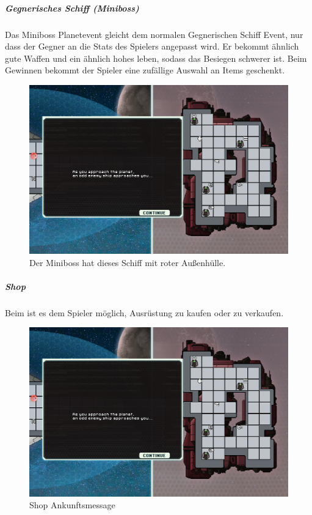 \documentclass[fontsize=12pt,paper=a4,twoside]{scrartcl}
\begin{document}
\subparagraph{Gegnerisches Schiff (Miniboss)} Das Miniboss Planetevent gleicht dem normalen Gegnerischen Schiff Event, nur dass der Gegner an die Stats des Spielers angepasst wird. Er bekommt ähnlich gute Waffen und ein ähnlich hohes leben, sodass das Besiegen schwerer ist. Beim Gewinnen bekommt der Spieler eine zufällige Auswahl an Items geschenkt. 

\begin{figure}[H]
\centering
\includegraphics[width=1\linewidth]{DasSpiel/Karte/miniboss.png}
\caption{Der Miniboss hat dieses Schiff mit roter Außenhülle.}
\end{figure} 

\subparagraph{Shop}
 Beim  ist es dem Spieler möglich, Ausrüstung zu kaufen oder zu verkaufen.

\begin{figure}[H]
\centering
\includegraphics[width=1\linewidth]{DasSpiel/Karte/miniboss.png}
\caption{Shop Ankunftsmessage}
\end{figure}
\end{document}
